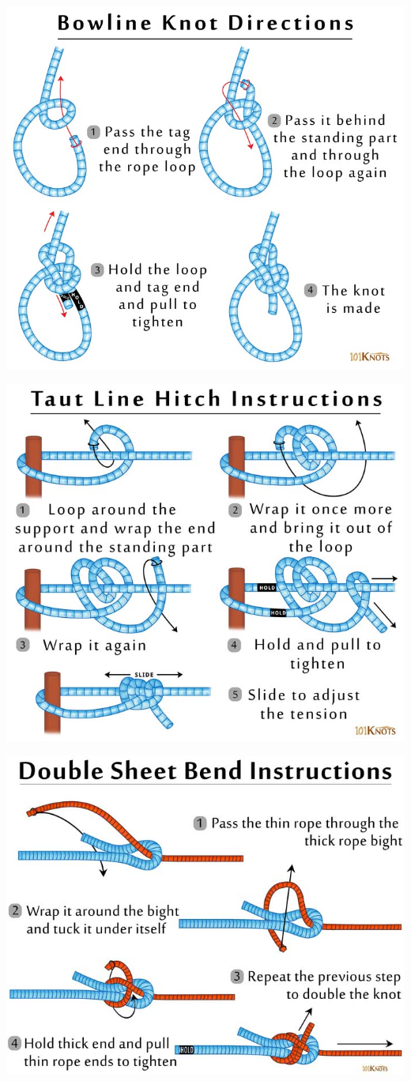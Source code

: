 \documentclass[12pt,noauthor,nooutcomes,instructornotes]{ximera}
\begin{document}
\newpage
    \centerline{\includegraphics[width=\paperwidth]{buildAnInstrument/How-to-Tie-a-Bowline-Knot.jpg}}

\newpage

\centerline{\includegraphics[width=\paperwidth]{buildAnInstrument/How-to-Tie-a-Taut-Line-Hitch.jpg}}

\newpage
\centerline{\includegraphics[width=\paperwidth]{buildAnInstrument/Tie-a-Double-Sheet-Becket-Bend.jpg}}
\end{document}
